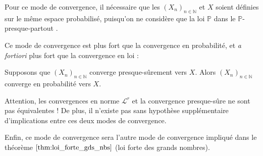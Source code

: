 \documentclass[../integ-proba.tex]{subfiles}
\begin{document}
\begin{rem}
    Pour ce mode de convergence, il nécessaire que les $\left(X_n\right)_{n\in\mathbb{N}}$ et $X$ soient définies sur le même espace probabilisé, puisqu'on ne considère que la loi $\mathbb{P}$ dans le \og $\mathbb{P}$-presque-partout \fg.
\end{rem}

Ce mode de convergence est plus fort que la convergence en probabilité, et \textit{a fortiori} plus fort que la convergence en loi :

\begin{prop}
    Supposons que $\left(X_n\right)_{n\in\mathbb{N}}$ converge presque-sûrement vers $X$.
    Alors $\left(X_n\right)_{n\in\mathbb{N}}$ converge en probabilité vers $X$.
\end{prop}

\begin{rem}
    Attention, les convergences en norme $\mathcal{L}^r$ et la convergence presque-sûre ne sont pas équivalentes !
    De plus, il n'existe pas sans hypothèse supplémentaire d'implications entre ces deux modes de convergence.
\end{rem}


\begin{rem}
    Enfin, ce mode de convergence sera l'autre mode de convergence impliqué dans le théorème $\ref{thm:loi_forte_gds_nbs}$ (loi forte des grands nombres).
\end{rem}
\end{document}
